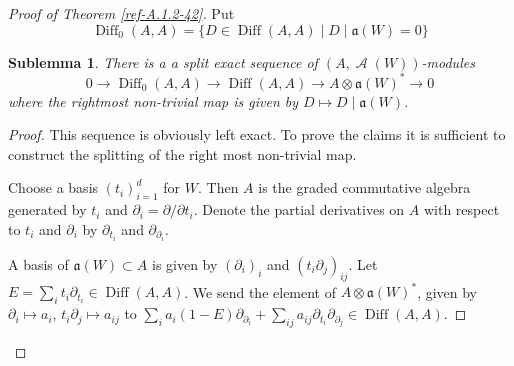 \documentclass{amsart}
\numberwithin{equation}{section}
\let\cal\mathcal
\newtheorem*{sublemma}{Sublemma}
\theoremstyle{definition}
\theoremstyle{remark}
\begin{document}
\begin{proof}[Proof of Theorem \ref{ref-A.1.2-42}]
Put 
\[
{\operatorname{Diff}}_0(A,A)=\{D\in {\operatorname{Diff}}(A,A)\mid D{\mid}{\mathfrak{a}}(W)=0\}
\]
\begin{sublemma}
There is a a split exact sequence of $(A,{\operatorname{{\cal A}}}(W))$-modules
\[
0{\rightarrow}{\operatorname{Diff}}_0(A,A)\rightarrow {\operatorname{Diff}}(A,A)\rightarrow A\otimes {\mathfrak{a}}(W)^\ast\rightarrow 0
\]
where the rightmost non-trivial map is given by $D\mapsto D\mid {\mathfrak{a}}(W)$. 
\end{sublemma}
\begin{proof} This sequence is obviously left exact. To prove the claims
it is sufficient to construct the splitting of the right most non-trivial map.

Choose a basis $(t_i)_{i=1}^d$ for $W$. Then $A$ is the graded
commutative algebra generated by $t_i$ and
$\partial_i=\partial/\partial t_i$. Denote the partial derivatives on
$A$ with respect to $t_i$ and $\partial_i$ by $\partial_{t_i}$ and
$\partial_{\partial_i}$.

A basis of ${\mathfrak{a}}(W)\subset A$ is given by $(\partial_i)_i$ and
$(t_i\partial_j)_{ij}$. Let $E=\sum_i t_i\partial_{t_i}\in {\operatorname{Diff}}(A,A)$. 
We send the element of $A\otimes {\mathfrak{a}}(W)^\ast$, given by
$\partial_i\mapsto a_i$, $t_i\partial_j\mapsto a_{ij}$ to 
$\sum_i a_i(1-E)\partial_{\partial_i}+\sum_{ij}a_{ij}\partial_{t_i}\partial_{\partial_j}\in {\operatorname{Diff}}(A,A)$. 


\end{proof}
\end{proof}
\end{document}
